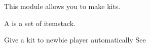 This module allows you to make kits.

A  is a set of itemstack.


\begin{example}{Give a kit to newbie player automatically}
    See~
\end{example}
